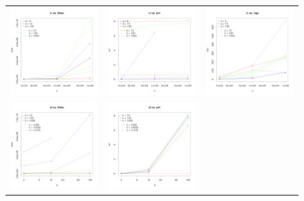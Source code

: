 \documentclass[10pt,a4,uplatex]{jsarticle}
\begin{document}
\begin{figure}[!htbp]
  \centering %
  \begin{tabular}{ccc}
      \includegraphics[width=0.33\hsize]{./n_time.pdf}
      &
      \includegraphics[width=0.33\hsize]{./n_err.pdf}
      &
      \includegraphics[width=0.33\hsize]{./n_rep.pdf}
    \\
      \includegraphics[width=0.33\hsize]{./d_time.pdf}
      &
      \includegraphics[width=0.33\hsize]{./d_err.pdf}

\end{tabular}
\end{figure}
\end{document}
